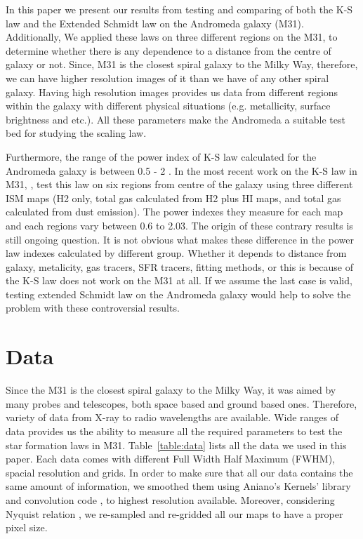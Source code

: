 \documentclass[useAMS,usenatbib]{mn2e}
\begin{document}
In this paper we present our results from testing and comparing of both the K-S law and the Extended Schmidt law on the Andromeda galaxy (M31). %
Additionally, We applied these laws on three different regions on the M31, to determine whether there is any dependence to a distance from the centre of galaxy or not. Since, M31 is the closest spiral galaxy to the Milky Way, therefore, we can have higher resolution images of it than we have of any other spiral galaxy. Having high resolution images provides us data from different regions within
the galaxy with different physical situations (e.g. metallicity, surface brightness and etc.). All these parameters make the Andromeda a suitable test bed for studying the scaling law.

Furthermore, the range of the power index of K-S law calculated for the Andromeda galaxy is between 0.5 - 2 \citep[e.g.,][]{Tabatabaei10,Ford13}. %
In the most recent work on the K-S law in M31, \cite{Ford13}, test this law on six regions from centre of the galaxy using three different ISM maps (H2 only, total gas calculated from H2 plus HI maps, and total gas calculated from dust emission). The power indexes they measure for each map and each regions vary between 0.6 to 2.03. The origin of these contrary results is still ongoing question. It is not obvious what makes these difference in the power law indexes calculated by different group. Whether it depends to distance from galaxy, metalicity, gas tracers, SFR tracers, fitting methods, or this is because of the K-S law does not work on the M31 at all. If we assume the last case is valid, testing extended Schmidt law on the Andromeda galaxy would help to solve the problem with these controversial results.


\section{Data}
\label{sec:data}
Since the M31 is the closest spiral galaxy to the Milky Way, it was aimed by many probes and telescopes, both space based and ground based ones. Therefore, variety of data from X-ray to radio wavelengths are available. Wide ranges of data provides us the ability to measure all the required parameters to test the star formation laws in M31. Table~\ref{table:data} lists all the data we used in this paper. Each data comes with different Full Width Half Maximum (FWHM), spacial resolution and grids. In order to make sure that all our data contains the same amount of information, we smoothed them using Aniano's Kernels' library and convolution code \citep{Aniano12}, to highest resolution available. Moreover, considering Nyquist relation \citep{Nyquist}, we re-sampled and re-gridded all our maps to have a proper pixel size.
\end{document}
